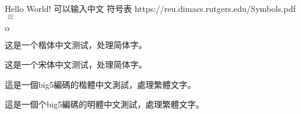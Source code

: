 \documentclass{article}
\begin{document}
\begin{CJK}{UTF8}{gbsn}
  Hello World!
  可以输入中文
  符号表  https://reu.dimacs.rutgers.edu/Symbols.pdf
  $\equiv$

  $\alpha$

\end{CJK}


\begin{CJK}{UTF8}{gkai}  
这是一个楷体中文测试，处理简体字。  
\end{CJK}  
\begin{CJK}{UTF8}{gbsn}  
这是一个宋体中文测试，处理简体字。  
\end{CJK}  
\begin{CJK}{UTF8}{bkai}  
這是一個big5編碼的楷體中文測試，處理繁體文字。  
\end{CJK}  
\begin{CJK}{UTF8}{bsmi}  
這是一個个big5編碼的明體中文測試，處理繁體文字。  
\end{CJK}  
\end{document}
